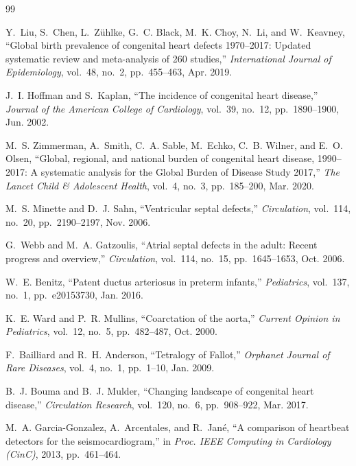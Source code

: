 \documentclass[12pt,a4paper]{amritareport}
\begin{document}
\begin{thebibliography}{99}

Y.~Liu, S.~Chen, L.~Z{\"u}hlke, G.~C. Black, M.~K. Choy, N.~Li, and W.~Keavney,
``Global birth prevalence of congenital heart defects 1970--2017: Updated systematic review and meta-analysis of 260 studies,''
\textit{International Journal of Epidemiology}, vol.~48, no.~2, pp.~455--463, Apr. 2019.

J.~I. Hoffman and S.~Kaplan,
``The incidence of congenital heart disease,''
\textit{Journal of the American College of Cardiology}, vol.~39, no.~12, pp.~1890--1900, Jun. 2002.

M.~S. Zimmerman, A.~Smith, C.~A. Sable, M.~Echko, C.~B. Wilner, and E.~O. Olsen,
``Global, regional, and national burden of congenital heart disease, 1990--2017: A systematic analysis for the Global Burden of Disease Study 2017,''
\textit{The Lancet Child \& Adolescent Health}, vol.~4, no.~3, pp.~185--200, Mar. 2020.

M.~S. Minette and D.~J. Sahn,
``Ventricular septal defects,''
\textit{Circulation}, vol.~114, no.~20, pp.~2190--2197, Nov. 2006.

G.~Webb and M.~A. Gatzoulis,
``Atrial septal defects in the adult: Recent progress and overview,''
\textit{Circulation}, vol.~114, no.~15, pp.~1645--1653, Oct. 2006.

W.~E. Benitz,
``Patent ductus arteriosus in preterm infants,''
\textit{Pediatrics}, vol.~137, no.~1, pp.~e20153730, Jan. 2016.

K.~E. Ward and P.~R. Mullins,
``Coarctation of the aorta,''
\textit{Current Opinion in Pediatrics}, vol.~12, no.~5, pp.~482--487, Oct. 2000.

F.~Bailliard and R.~H. Anderson,
``Tetralogy of Fallot,''
\textit{Orphanet Journal of Rare Diseases}, vol.~4, no.~1, pp.~1--10, Jan. 2009.

B.~J. Bouma and B.~J. Mulder,
``Changing landscape of congenital heart disease,''
\textit{Circulation Research}, vol.~120, no.~6, pp.~908--922, Mar. 2017.

M.~A. Garcia-Gonzalez, A.~Arcentales, and R.~Jan{\'e},
``A comparison of heartbeat detectors for the seismocardiogram,''
in \textit{Proc. IEEE Computing in Cardiology (CinC)}, 2013, pp.~461--464.


\end{thebibliography}
\end{document}
